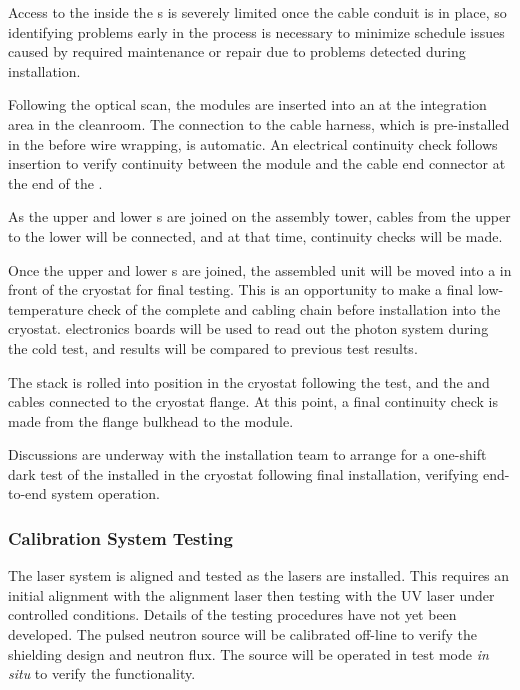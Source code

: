 Access to the  inside the s is severely limited once the  cable conduit is in place, so identifying problems early in the process is necessary to minimize schedule issues caused by required  maintenance or repair due to problems detected during installation.

Following the optical scan, the  modules are inserted into an   at the  integration area in the cleanroom. The connection to the cable harness, which is pre-installed in the  before wire wrapping, is automatic. An electrical continuity check follows insertion to verify  continuity between the  module and the  cable end connector at the end of the .

As the upper and lower s are joined on the assembly tower,  cables from the upper to the lower  will be connected, and at that time, continuity checks will be made.

Once the upper and lower s are joined, the assembled unit will be moved into a \coldbox in front of the cryostat for final testing.  This is an opportunity to make a final low-temperature check of the complete   and cabling chain before installation into the cryostat.    electronics boards will be used to read out the photon system during the cold test, and results will be compared to previous  test results.

The  stack is rolled into position in the cryostat following the \coldbox test, and the  and  cables connected to the cryostat flange.  At this point, a final continuity check is made from the flange bulkhead to the  module.

Discussions are underway with the installation team to arrange for a one-shift dark test of the installed  in the cryostat following final installation, verifying end-to-end system operation.

\subsubsection{Calibration System Testing}
The laser system is aligned and tested as the lasers are installed. This requires an initial alignment with the alignment laser then testing with the UV laser under controlled conditions. Details of the testing procedures have not yet been developed. The pulsed neutron source will be calibrated off-line to verify the shielding design and neutron flux.  The source will be operated in test mode \textit{in situ} to verify the functionality. 

